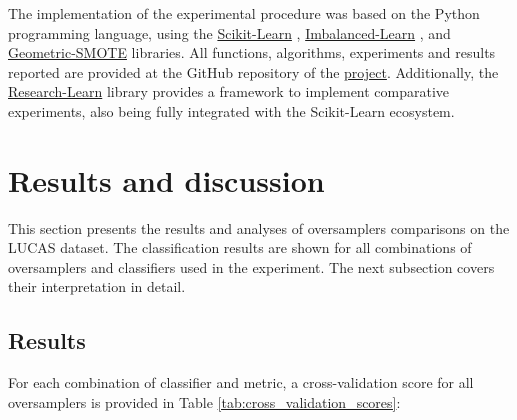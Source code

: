 \documentclass[remotesensing,article,submit,moreauthors,pdftex]{Definitions/mdpi}
\begin{document}
The implementation of the experimental procedure was based on the Python
programming language, using the
\href{https://scikit-learn.org/stable/}{Scikit-Learn} \cite{Pedregosa2011},
\href{https://imbalanced-learn.org/en/stable/}{Imbalanced-Learn} \cite{JMLR:v18:16-365},
and
\href{https://geometric-smote.readthedocs.io/en/latest/?badge=latest}{Geometric-SMOTE}
libraries. All functions, algorithms, experiments and results reported are
provided at the GitHub repository of the
\href{https://github.com/AlgoWit/publications/tree/master/remote-sensing-lucas}{project}.
Additionally, the
\href{https://research-learn.readthedocs.io/en/latest/?badge=latest}{Research-Learn}
library provides a framework to implement comparative experiments, also being
fully integrated with the Scikit-Learn ecosystem.

\section{Results and discussion}

This section presents the results and analyses of oversamplers comparisons on the LUCAS dataset. The classification results are shown for all combinations of oversamplers and classifiers used in the experiment. The next subsection covers their interpretation in detail.

\subsection{Results}

For each combination of classifier and metric, a cross-validation score for all oversamplers is provided in Table \ref{tab:cross_validation_scores}:

\end{document}

